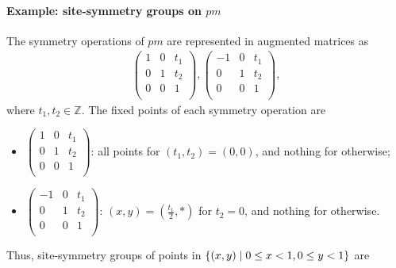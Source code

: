 \paragraph{Example: site-symmetry groups on $pm$}

The symmetry operations of $pm$ are represented in augmented matrices as
\begin{align*}
  \left(
    \begin{array}{cc|c}
        1 & 0 & t_{1} \\
        0 & 1 & t_{2} \\
        \hline
        0 & 0 & 1 \\
    \end{array}
  \right),
  \left(
    \begin{array}{cc|c}
        -1 & 0 & t_{1} \\
        0  & 1 & t_{2} \\
        \hline
        0 & 0 & 1 \\
    \end{array}
  \right),
\end{align*}
where $t_{1}, t_{2} \in \mathbb{Z}$.
The fixed points of each symmetry operation are
\begin{itemize}
  \item $\left(
    \begin{array}{cc|c}
        1 & 0 & t_{1} \\
        0 & 1 & t_{2} \\
        \hline
        0 & 0 & 1 \\
    \end{array}
  \right)$: all points for $(t_{1}, t_{2}) = (0, 0)$, and nothing for otherwise;
  \item $\left(
    \begin{array}{cc|c}
        -1 & 0 & t_{1} \\
        0  & 1 & t_{2} \\
        \hline
        0 & 0 & 1 \\
    \end{array}
  \right)$: $(x, y) = (\frac{t_{1}}{2}, \ast)$ for $t_{2} = 0$, and nothing for otherwise.
\end{itemize}
Thus, site-symmetry groups of points in $\left\{ (x, y) \mathrel{}\middle|\mathrel{}  0 \leq x < 1, 0 \leq y < 1 \right\}$ are
